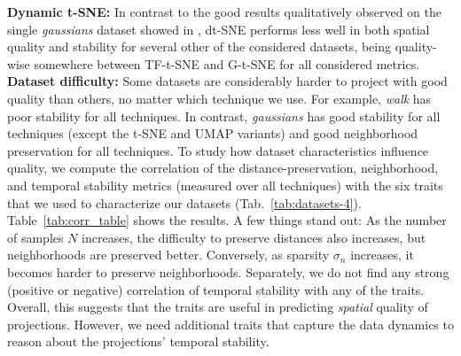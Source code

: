 \noindent\textbf{Dynamic t-SNE:} In contrast to the good results qualitatively observed on the single \emph{gaussians} dataset showed in \cite{Rauber2016}, dt-SNE performs less well in both spatial quality and stability for several other of the considered datasets, being quality-wise somewhere between TF-t-SNE and G-t-SNE for all considered metrics.\\

%




\noindent\textbf{Dataset difficulty:} Some datasets are considerably harder to project with good quality than others, no matter which technique we use. For example, \emph{walk} has poor stability for all techniques. In contrast, \emph{gaussians} has good stability for all techniques (except the t-SNE and UMAP variants) and good neighborhood preservation for all techniques. To study how dataset characteristics influence quality, we compute the correlation of the distance-preservation, neighborhood, and temporal stability metrics (measured over all techniques) with the six traits that we used to characterize our datasets (Tab.~\ref{tab:datasets-4}). Table~\ref{tab:corr_table} shows the results. A few things stand out: As the number of samples $N$ increases, the difficulty to preserve distances also increases, but neighborhoods are preserved better. Conversely, as sparsity $\sigma_n$ increases, it becomes harder to preserve neighborhoods. Separately, we do not find any strong (positive or negative) correlation of temporal stability with any of the traits. Overall, this suggests that the traits are useful in predicting \emph{spatial} quality of projections. However, we need additional traits that capture the data dynamics to reason about the projections' temporal stability.


